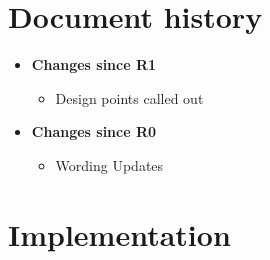 \documentclass[a4paper,10pt,oneside,openany,final,article]{memoir}
\begin{document}
\chapter*{Document history}

\begin{itemize}
\item \textbf{Changes since R1}
  \begin{itemize}
  \item Design points called out
  \end{itemize}
\item \textbf{Changes since R0}
  \begin{itemize}
  \item Wording Updates
  \end{itemize}
\end{itemize}

\renewcommand{\bibname}{References}




\backmatter
\chapter*{Implementation}
\end{document}
